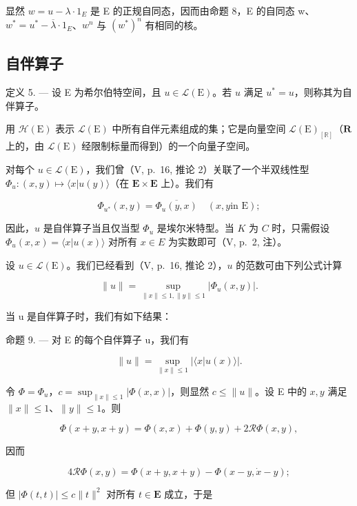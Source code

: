 显然 \(w = u - \lambda \cdot 1_{E}\) 是 E 的正规自同态，因而由命题 8，E 的自同态 w、\(w^{*} = u^{*} - \overline{\lambda} \cdot 1_{E}\)、\(w^{n}\) 与 \((w^{*})^{n}\) 有相同的核。

\subsection{自伴算子}

定义 5. --- 设 E 为希尔伯特空间，且 \(u \in \mathcal{L}(\mathrm{E})\)。若 \(u\) 满足 \(u^* = u\)，则称其为自伴算子。

用 \(\mathcal{H}(\mathrm{E})\) 表示 \(\mathcal{L}(\mathrm{E})\) 中所有自伴元素组成的集；它是向量空间 \(\mathcal{L}(\mathrm{E})_{[\mathbb{R}]}\)（\(\mathbf{R}\) 上的，由 \(\mathcal{L}(\mathrm{E})\) 经限制标量而得到）的一个向量子空间。

对每个 \(u \in \mathcal{L}(\mathrm{E})\)，我们曾（V, p.~16, 推论 2）关联了一个半双线性型 \(\Phi_u : (x, y) \mapsto \langle x | u(y) \rangle\)（在 \(\mathbf{E} \times \mathbf{E}\) 上）。我们有

\[
\Phi_ {u ^ {*}} (x, y) = \overline {{{{\Phi_ {u} (y , x)}}}} \quad (x, y \text {in E});\tag{14}
\]

因此，\(u\) 是自伴算子当且仅当型 \(\Phi_u\) 是埃尔米特型。当 \(K\) 为 \(C\) 时，只需假设 \(\Phi_u(x, x) = \langle x | u(x) \rangle\) 对所有 \(x \in E\) 为实数即可（V, p.~2, 注）。

设 \(u \in \mathcal{L}(\mathrm{E})\)。我们已经看到（V, p.~16, 推论 2），\(u\) 的范数可由下列公式计算

\[
\| u \| = \sup _ {\| x \| \leqslant 1, \| y \| \leqslant 1} \left| \Phi_ {u} (x, y) \right|.\tag{15}
\]

当 u 是自伴算子时，我们有如下结果：

命题 9. --- 对 E 的每个自伴算子 u，我们有

\[
\| u \| = \sup _ {\| x \| \leqslant 1} | \langle x | u (x) \rangle |.\tag{16}
\]

令 \(\Phi = \Phi_{u}\)，\(c = \sup_{\| x\| \leqslant 1}|\Phi (x,x)|\)，则显然 \(c\leqslant \| u\|\)。设 E 中的 \(x,y\) 满足 \(\| x\| \leqslant 1\)、\(\| y\| \leqslant 1\)。则

\[
\Phi (x + y, x + y) = \Phi (x, x) + \Phi (y, y) + 2 \mathscr {R} \Phi (x, y),
\]

因而

\[
4 \mathscr {R} \Phi (x, y) = \Phi (x + y, x + y) - \Phi (x - y, \dot {x} - y);
\]

但 \(|\Phi(t, t)| \leqslant c \|t\|^2\) 对所有 \(t \in \mathbf{E}\) 成立，于是

